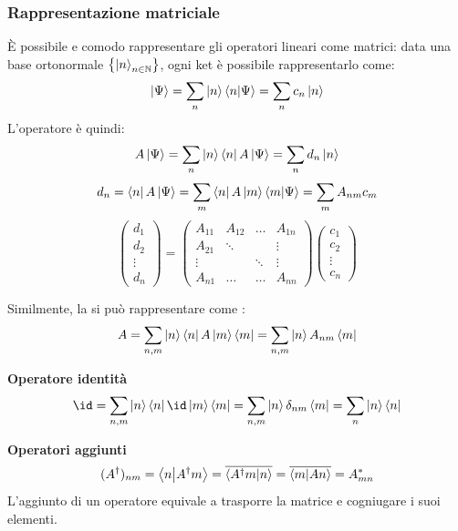 \subsubsection{Rappresentazione matriciale}
È possibile e comodo rappresentare gli operatori lineari come matrici:
data una base ortonormale \(\left\{ \ket{n}_{n \in \mathbb{N}} \right\}\),
ogni ket è possibile rappresentarlo come:
\[
\ket{\Psi}= \sum_n \ket{n}\braket{n}{\Psi}= \sum_n c_n \ket{n}
\]
L'operatore è quindi:
\[
    A\ket{\Psi}= \sum_n \ket{n} \bra{n}A\ket{\Psi}= \sum_n d_n \ket{n}
\]
\[
    d_n= \bra{n}A\ket{\Psi} = \sum_m \bra{n} A \ket{m}\bra{m}\ket{\Psi}= \sum_m A_{nm}c_m 
\]
\[
    \begin{pmatrix}
        d_1\\d_2\\ \vdots\\d_n
    \end{pmatrix}= 
    \begin{pmatrix}
        A_{11} & A_{12} & \dots & A_{1n} \\
        A_{21} & \ddots & &\vdots\\
        \vdots& &\ddots & \vdots \\
        A_{n1} & \dots & \dots & A_{nn}
    \end{pmatrix}
    \begin{pmatrix}
        c_1 \\
        c_2\\
        \vdots\\
        c_n 
    \end{pmatrix}
\]

Similmente, la si può rappresentare come :
\begin{equation}
    A = \sum_{n,m} \ket{n} \bra{n}A \ket{m} \bra{m} = \sum_{n,m} \ket{n}  A_{nm} \bra{m}    
\end{equation}

\begin{example}
    \textbf{Operatore identità}
    \begin{equation}
        \id= \sum_{n,m} \ket{n}\bra{n} \id \ket{m}\bra{m}= \sum_{n,m} \ket{n}\delta_{nm}\bra{m}= \sum_n \ket{n}\bra{n}
    \end{equation}
\end{example}

\begin{example}
    \textbf{Operatori aggiunti}
    \begin{equation}
        (A^\dagger)_{nm}= \braket{n}{A^\dagger m}= \overline{\braket{A^\dagger m}{n}}= \overline{\braket{m}{A n}}= A_{mn}^*
    \end{equation}
    L'aggiunto di un operatore equivale a trasporre la matrice e cogniugare i suoi elementi.
\end{example}


